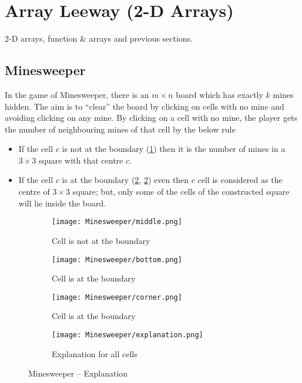 \section{Array Leeway (2-D Arrays)}
\begin{topics}
2-D arrays, function \& arrays and previous sections.
\end{topics}
\subsection{Minesweeper}
In the game of Minesweeper, there is an $m\times n$ board which has exactly $k$ mines hidden. The aim is to ``clear'' the board by clicking on cells with no mine and avoiding clicking on any mine. By clicking on a cell with no mine, the player gets the number of neighbouring mines of that cell by the below rule
\begin{itemize}	
	\item If the cell $c$ is not at the boundary (\ref{fig:minecnb}) then it is the number of mines in a $3\times3$ square with that centre $c$.
	\item If the cell $c$ is at the boundary (\ref{fig:minecb1}, \ref{fig:minecb1}) even then $c$ cell is considered as the centre of $3\times3$ square; but, only some of the cells of the constructed square will lie inside the board.
\end{itemize}
\begin{figure}[H]
	\centering
	\begin{subfigure}[t]{0.25\linewidth}
		\centering
		\texttt{[image: Minesweeper/middle.png]}
		\caption{Cell is not at the boundary}
		\label{fig:minecnb}
	\end{subfigure}
	\begin{subfigure}[t]{0.22\linewidth}
		\centering
		\texttt{[image: Minesweeper/bottom.png]}
		\caption{Cell is at the boundary}
		\label{fig:minecb1}
	\end{subfigure}
	\begin{subfigure}[t]{0.22\linewidth}
		\centering
		\texttt{[image: Minesweeper/corner.png]}
		\caption{Cell is at the boundary}
		\label{fig:minecb2}
	\end{subfigure}
	\begin{subfigure}[t]{0.22\linewidth}
		\centering
		\texttt{[image: Minesweeper/explanation.png]}
		\caption{Explanation for all cells}
		\label{fig:minee}
	\end{subfigure}
	\caption{Minesweeper -- Explanation}
\end{figure}
